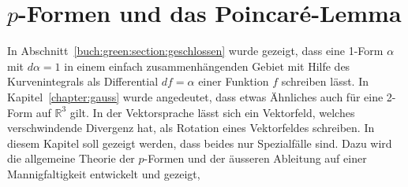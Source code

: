%
%
%
\chapter{$p$-Formen und das Poincaré-Lemma
\label{chapter:pformen}}

\noindent
In Abschnitt~\ref{buch:green:section:geschlossen} wurde gezeigt, dass eine
1-Form $\alpha$ mit $d\alpha=1$ in einem einfach zusammenhängenden Gebiet
mit Hilfe des Kurvenintegrals als Differential $df=\alpha$ einer Funktion
$f$ schreiben lässt.
In Kapitel~\ref{chapter:gauss} wurde angedeutet, dass etwas Ähnliches auch
für eine 2-Form auf $\mathbb{R}^3$ gilt.
In der Vektorsprache lässt sich ein Vektorfeld, welches verschwindende
Divergenz hat, als Rotation eines Vektorfeldes schreiben.
In diesem Kapitel soll gezeigt werden, dass beides nur Spezialfälle sind.
Dazu wird die allgemeine Theorie der $p$-Formen und der äusseren Ableitung
auf einer Mannigfaltigkeit entwickelt und gezeigt, 






